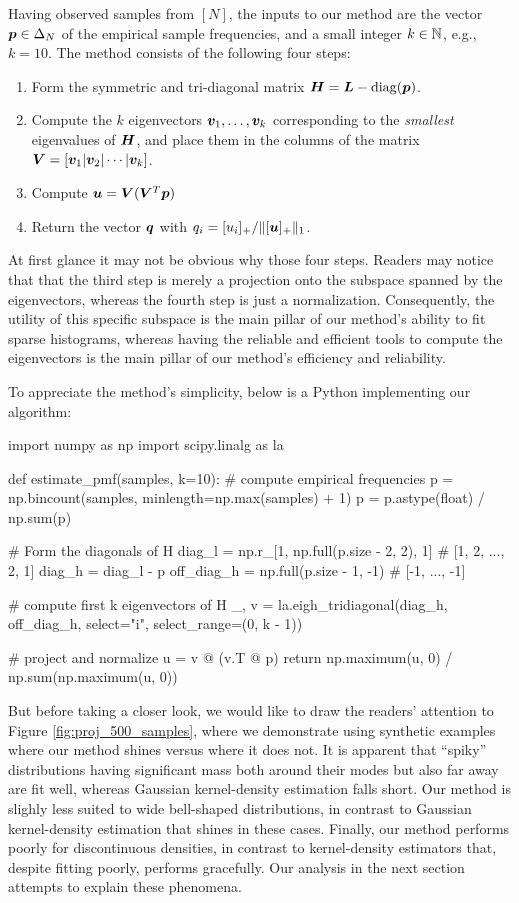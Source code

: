 \documentclass[10pt]{article} %
\DeclareMathOperator{\diag}{diag}
\begin{document}
Having observed samples from $[N]$, the inputs to our method are the vector ${\bm{p}} \in \Delta_N$ of the empirical sample frequencies, and a small integer $k \in {\mathbb{N}}$, e.g., $k = 10$. The method consists of the following four steps:
\begin{enumerate}
\item Form the symmetric and tri-diagonal matrix $\mH = \mL - \diag(\vp)$.
\item Compute the $k$ eigenvectors ${\bm{v}}_1, \dots, {\bm{v}}_k$ corresponding to the \emph{smallest} eigenvalues of ${\bm{H}}$, and place them in the columns of the matrix ${\bm{V}} = [{\bm{v}}_1 \vert {\bm{v}}_2 \vert \cdots \vert {\bm{v}}_k]$.
\item Compute ${\bm{u}} = {\bm{V}} ({\bm{V}}^T {\bm{p}})$
\item Return the vector ${\bm{q}}$ with ${q}_i = [u_i]_+ / \|[{\bm{u}}]_+ \|_1$.
\end{enumerate}
At first glance it may not be obvious why those four steps. Readers may notice that that the third step is merely a projection onto the subspace spanned by the eigenvectors, whereas the fourth step is just a normalization. Consequently, the utility of this specific subspace is the main pillar of our method's ability to fit sparse histograms, whereas having the reliable and efficient tools to compute the eigenvectors is the main pillar of our method's efficiency and reliability.

To appreciate the method's simplicity, below is a Python implementing our algorithm:
\begin{pycode}
import numpy as np
import scipy.linalg as la

def estimate_pmf(samples, k=10):
    # compute empirical frequencies
    p = np.bincount(samples, minlength=np.max(samples) + 1)
    p = p.astype(float) / np.sum(p)

    # Form the diagonals of H
    diag_l = np.r_[1, np.full(p.size - 2, 2), 1]  # [1, 2, ..., 2, 1]
    diag_h = diag_l - p
    off_diag_h = np.full(p.size - 1, -1)          # [-1, ..., -1]

    # compute first k eigenvectors of H
    _, v = la.eigh_tridiagonal(diag_h, off_diag_h, select="i", select_range=(0, k - 1))

    # project and normalize
    u = v @ (v.T @ p)
    return np.maximum(u, 0) / np.sum(np.maximum(u, 0))
\end{pycode}

But before taking a closer look, we would like to draw the readers' attention to Figure \ref{fig:proj_500_samples}, where we demonstrate using synthetic examples where our method shines versus where it does not. It is apparent that ``spiky'' distributions having significant mass both around their modes but also far away are fit well, whereas Gaussian kernel-density estimation falls short. Our method is slighly less suited to wide bell-shaped distributions, in contrast to Gaussian kernel-density estimation that shines in these cases. Finally, our method performs poorly for discontinuous densities, in contrast to kernel-density estimators that, despite fitting poorly, performs gracefully. Our analysis in the next section attempts to explain these phenomena.
\end{document}
